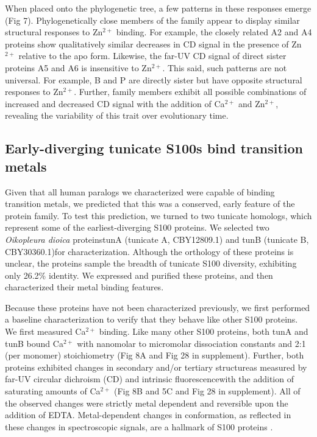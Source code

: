 When placed onto the phylogenetic tree, a few patterns in these responses
emerge (Fig 7). Phylogenetically close members of the family appear
to display similar structural responses to Zn$^{2+}$ binding. For
example, the closely related A2 and A4 proteins show qualitatively
similar decreases in CD signal in the presence of Zn$^{2+}$ relative
to the apo form. Likewise, the far-UV CD signal of direct sister proteins
A5 and A6 is insensitive to Zn$^{2+}$. This said, such patterns are
not universal. For example, B and P are directly sister but have opposite
structural responses to Zn$^{2+}$. Further, family members exhibit
all possible combinations of increased and decreased CD signal with
the addition of Ca$^{2+}$ and Zn$^{2+}$, revealing the variability
of this trait over evolutionary time.


\subsection{Early-diverging tunicate S100s bind transition metals}

Given that all human paralogs we characterized were capable of binding
transition metals, we predicted that this was a conserved, early feature
of the protein family. To test this prediction, we turned to two tunicate
homologs, which represent some of the earliest-diverging S100 proteins.
We selected two \textit{Oikopleura dioica} proteins\textemdash tunA
(tunicate A, CBY12809.1) and tunB (tunicate B, CBY30360.1)\textemdash for
characterization. Although the orthology of these proteins is unclear,
the proteins sample the breadth of tunicate S100 diversity, exhibiting
only 26.2\% identity. We expressed and purified these proteins, and
then characterized their metal binding features.

Because these proteins have not been characterized previously, we
first performed a baseline characterization to verify that they behave
like other S100 proteins. We first measured Ca$^{2+}$ binding. Like
many other S100 proteins, both tunA and tunB bound Ca$^{2+}$ with
nanomolar to micromolar dissociation constants and 2:1 (per monomer)
stoichiometry (Fig 8A and Fig 28 in supplement). Further, both proteins exhibited
changes in secondary and/or tertiary structure\textemdash as measured
by far-UV circular dichroism (CD) and intrinsic fluorescence\textemdash with
the addition of saturating amounts of Ca$^{2+}$ (Fig 8B and 5C and
Fig 28 in supplement). All of the observed changes were strictly metal dependent
and reversible upon the addition of EDTA. Metal-dependent changes
in conformation, as reflected in these changes in spectroscopic signals,
are a hallmark of S100 proteins \cite{koch_implications_2007,bertini_solution_2009,mani_circular_1983,schafer_s100_1996}.

